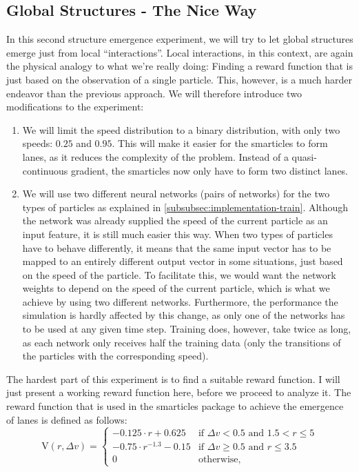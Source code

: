 \subsection{Global Structures - The Nice Way}
In this second structure emergence experiment, we will try to let global structures emerge just from local \enquote{interactions}. Local interactions, in this context, are again the physical analogy to what we're really doing: Finding a reward function that is just based on the observation of a single particle. This, however, is a much harder endeavor than the previous approach. We will therefore introduce two modifications to the experiment:
\begin{enumerate}
    \item We will limit the speed distribution to a binary distribution, with only two speeds: $0.25$ and $0.95$. This will make it easier for the smarticles to form lanes, as it reduces the complexity of the problem. Instead of a quasi-continuous gradient, the smarticles now only have to form two distinct lanes.
    \item We will use two different neural networks (pairs of networks) for the two types of particles as explained in \ref{subsubsec:implementation-train}. Although the network was already supplied the speed of the current particle as an input feature, it is still much easier this way. When two types of particles have to behave differently, it means that the same input vector has to be mapped to an entirely different output vector in some situations, just based on the speed of the particle. To facilitate this, we would want the network weights to depend on the speed of the current particle, which is what we achieve by using two different networks. Furthermore, the performance the simulation is hardly affected by this change, as only one of the networks has to be used at any given time step. Training does, however, take twice as long, as each network only receives half the training data (only the transitions of the particles with the corresponding speed).
\end{enumerate}
The hardest part of this experiment is to find a suitable reward function. I will just present a working reward function here, before we proceed to analyze it. The reward function that is used in the smarticles package to achieve the emergence of lanes is defined as follows:
\begin{equation}
    \text{V}(r, \Delta v) = \begin{cases}
        -0.125 \cdot r + 0.625 & \text{if } \Delta v < 0.5 \text{ and } 1.5 < r \le 5 \\
        -0.75 \cdot r^{-1.3} - 0.15 & \text{if } \Delta v \ge 0.5 \text{ and } r \le 3.5 \\
        0 & \text{otherwise} \text{,}
    \end{cases}
    \label{eq:lane_reward_func}
\end{equation}
